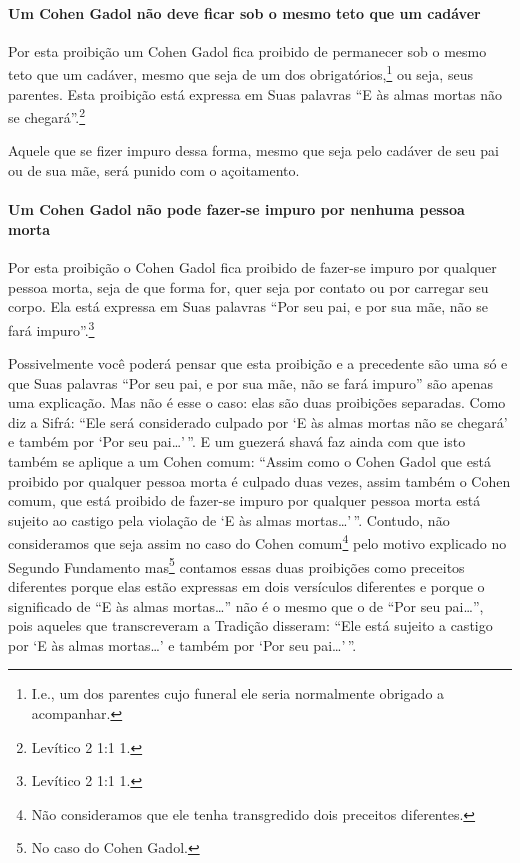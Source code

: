 \paragraph{Um Cohen Gadol não deve ficar sob o mesmo teto que um cadáver}

Por esta proibição um Cohen Gadol fica proibido de permanecer sob o
mesmo teto que um cadáver, mesmo que seja de um dos
obrigatórios,\footnote{I.e., um dos parentes cujo funeral ele seria normalmente obrigado a acompanhar.} ou seja, seus parentes. Esta
proibição está expressa em Suas palavras ``E às almas mortas não se
chegará''.\footnote{Levítico 2 1:1 1.}

Aquele que se fizer impuro dessa forma, mesmo que seja pelo cadáver de
seu pai ou de sua mãe, será punido com o açoitamento.

\paragraph{Um Cohen Gadol não pode fazer-se impuro por nenhuma pessoa morta}

Por esta proibição o Cohen Gadol fica proibido de fazer-se impuro
por qualquer pessoa morta, seja de que forma for, quer seja por contato
ou por carregar seu corpo. Ela está expressa em Suas palavras ``Por seu
pai, e por sua mãe, não se fará impuro''.\footnote{Levítico 2 1:1 1.}

Possivelmente você poderá pensar que esta proibição e a precedente são
uma só e que Suas palavras ``Por seu pai, e por sua mãe, não se fará
impuro'' são apenas uma explicação. Mas não é esse o caso: elas são
duas proibições separadas. Como diz a Sifrá: ``Ele será considerado
culpado por `E às almas mortas não se chegará' e também por `Por seu
pai\ldots{}'\,''. E um guezerá shavá\starr{} faz ainda com
que isto também se aplique a um Cohen comum: ``Assim como o Cohen
Gadol que está proibido por qualquer pessoa morta é culpado duas vezes,
assim também o Cohen comum, que está proibido de fazer-se impuro por
qualquer pessoa morta está sujeito ao castigo pela violação de `E às
almas mortas\ldots{}'\,''. Contudo, não consideramos que seja assim no caso do
Cohen comum\footnote{Não consideramos que ele tenha transgredido dois preceitos
  diferentes.} pelo motivo explicado no Segundo
Fundamento mas\footnote{No caso do Cohen Gadol.} contamos essas duas proibições
como preceitos diferentes porque elas estão expressas em dois
versículos diferentes e porque o significado de ``E às almas
mortas\ldots{}'' não é o mesmo que o de ``Por seu pai\ldots{}'', pois aqueles que
transcreveram a Tradição disseram: ``Ele está sujeito a castigo por `E
às almas mortas\ldots{}' e também por `Por seu pai\ldots{}'\,''.

